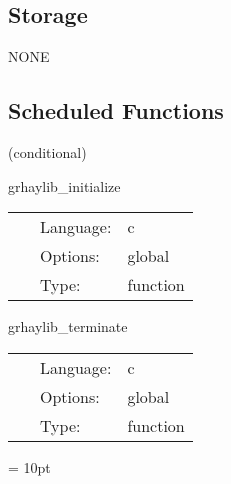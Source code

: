 \documentclass{article}
\begin{document}
\subsection*{Storage}NONE
\subsection*{Scheduled Functions}
\vspace{5mm}

   (conditional) 

\hspace{5mm} grhaylib\_initialize 

\hspace{5mm}{\it set up the grhayl structs and read the table for tabulated eos. } 


\hspace{5mm}

 \begin{tabular*}{160mm}{cll} 
~ & Language:  & c \\ 
~ & Options:  & global \\ 
~ & Type:  & function \\ 
\end{tabular*} 


\vspace{5mm}


\hspace{5mm} grhaylib\_terminate 

\hspace{5mm}{\it free memory allocated for the grhayl structs. } 


\hspace{5mm}

 \begin{tabular*}{160mm}{cll} 
~ & Language:  & c \\ 
~ & Options:  & global \\ 
~ & Type:  & function \\ 
\end{tabular*} 



\vspace{5mm}\parskip = 10pt 
\end{document}
